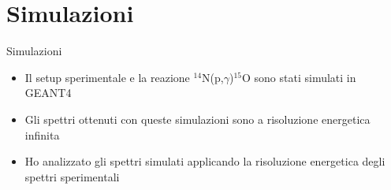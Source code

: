 \documentclass [xcolor=svgnames] {beamer}
\begin{document}
\section{Simulazioni}

\begin{frame}{Simulazioni}
	\begin{itemize}
		\item Il setup sperimentale e la reazione $^{14}$N(p,$\gamma$)$^{15}$O sono stati simulati in GEANT4
		\item Gli spettri ottenuti con queste simulazioni sono a risoluzione energetica infinita
		\item Ho analizzato gli spettri simulati applicando la risoluzione energetica degli spettri sperimentali
	\end{itemize}
\end{frame}
\end{document}
